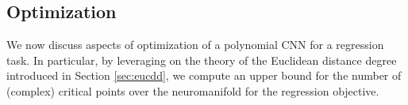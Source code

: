 \documentclass[twoside]{article}
\theoremstyle{plain}%
\newtheorem{lem}[thm]{Lemma}
\theoremstyle{definition}
\theoremstyle{remark}
\begin{document}
\subsection{Optimization}\label{sec:optim}
We now discuss aspects of optimization of a polynomial CNN for a regression task. In particular, by leveraging on the theory of the Euclidean distance degree introduced in Section \ref{sec:eucdd}, we compute an upper bound for the number of (complex) critical points over the neuromanifold for the regression objective. 
\end{document}
